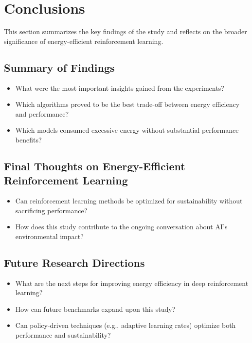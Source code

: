 \section{Conclusions}
\label{sec:conclusions}
This section summarizes the key findings of the study and reflects on the broader significance of energy-efficient reinforcement learning.

\subsection{Summary of Findings}
\begin{itemize}
	\item What were the most important insights gained from the experiments?
	\item Which algorithms proved to be the best trade-off between energy efficiency and performance?
	\item Which models consumed excessive energy without substantial performance benefits?
\end{itemize}

\subsection{Final Thoughts on Energy-Efficient Reinforcement Learning}
\begin{itemize}
	\item Can reinforcement learning methods be optimized for sustainability without sacrificing performance?
	\item How does this study contribute to the ongoing conversation about AI’s environmental impact?
\end{itemize}

\subsection{Future Research Directions}
\begin{itemize}
	\item What are the next steps for improving energy efficiency in deep reinforcement learning?
	\item How can future benchmarks expand upon this study?
	\item Can policy-driven techniques (e.g., adaptive learning rates) optimize both performance and sustainability?
\end{itemize}
